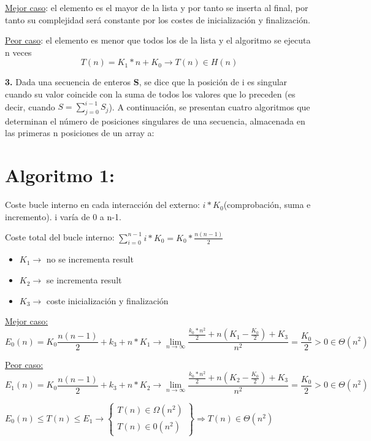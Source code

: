 \documentclass{article}
\begin{document}
\underline{Mejor caso}: el elemento es el mayor de la lista y por tanto se inserta al final, por tanto su complejidad será constante por los costes de inicialización y finalización.

\underline{Peor caso}: el elemento es menor que todos los de la lista y el algoritmo se ejecuta n veces
\[
    T(n) = K_{1}*n + K_{0} \rightarrow T(n) \in H(n)
\]

\textbf{3.} Dada una secuencia de enteros \textbf{S}, se dice que la posición de i es singular cuando su valor coincide con la suma de todos los valores que lo preceden (es decir, cuando $S = \sum_{j= 0}^{i -1} S_{j}$). A continuación, se presentan cuatro algoritmos que determinan el número de posiciones singulares de una secuencia, almacenada en las primeras n posiciones de un array a:
\section*{Algoritmo 1:}

\begin{figure}[H]
    \centering
    
\end{figure}

Coste bucle interno en cada interacción del externo: $i*K_{0}$(comprobación, suma e incremento). i varía de 0 a n-1.

Coste total del bucle interno: $\sum_{i = 0}^{n -1} i * K_{0} = K_{0} * \frac{n(n-1)}{2}$

\begin{itemize}
    \item $K_{1} \rightarrow$ no se incrementa result
    \item $K_{2} \rightarrow$ se incrementa result
    \item $K_{3} \rightarrow$ coste inicialización y finalización
\end{itemize}
\underline{Mejor caso:}
\[
    E_{0}(n) = K_{0}\frac{n(n-1)}{2} + k_{3} + n*K_{1} \rightarrow \lim_{n \rightarrow \infty} \frac{\frac{k_{0}*n^{2}}{2} + n(K_{1} - \frac{K_{0}}{2})+ K_{3}}{n^{2}} = \frac{K_{0}}{2} > 0 \in \Theta (n^{2})
\]

\underline{Peor caso: }
\[
    E_{1}(n) = K_{0}\frac{n(n-1)}{2} + k_{3} + n*K_{2} \rightarrow \lim_{n \rightarrow \infty} \frac{\frac{k_{0}*n^{2}}{2} + n(K_{2} - \frac{K_{0}}{2})+ K_{3}}{n^{2}} = \frac{K_{0}}{2} > 0 \in \Theta (n^{2})
\]

$E_{0}(n) \leq T(n) \leq E_{1} \rightarrow \left\{\begin{array}{l}
        T(n) \in \Omega(n^2) \\
        T(n) \in 0(n^2)
    \end{array}\right\} \Rightarrow T(n) \in \Theta (n^2)$
\end{document}

